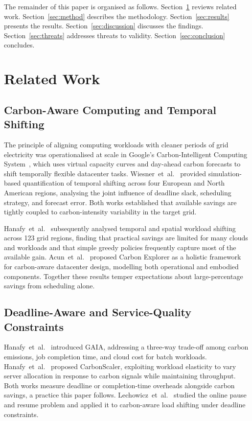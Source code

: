 \documentclass[conference]{IEEEtran}
\begin{document}
The remainder of this paper is organised as follows. Section~\ref{sec:related}
reviews related work. Section~\ref{sec:method} describes the methodology.
Section~\ref{sec:results} presents the results. Section~\ref{sec:discussion}
discusses the findings. Section~\ref{sec:threats} addresses threats to validity.
Section~\ref{sec:conclusion} concludes.

\section{Related Work}
\label{sec:related}

\subsection{Carbon-Aware Computing and Temporal Shifting}

The principle of aligning computing workloads with cleaner periods of grid
electricity was operationalised at scale in Google's Carbon-Intelligent
Computing System~\cite{radovanovic2023}, which uses virtual capacity curves and
day-ahead carbon forecasts to shift temporally flexible datacenter tasks.
Wiesner~et~al.~\cite{wiesner2021} provided simulation-based quantification of
temporal shifting across four European and North American regions, analysing
the joint influence of deadline slack, scheduling strategy, and forecast error.
Both works established that available savings are tightly coupled to
carbon-intensity variability in the target grid.

Hanafy~et~al.~\cite{frachtenberg2023limitations} subsequently analysed
temporal and spatial workload shifting across 123 grid regions, finding that
practical savings are limited for many clouds and workloads and that simple
greedy policies frequently capture most of the available gain. Acun~et~al.\
\cite{acun2023} proposed Carbon Explorer as a holistic framework for
carbon-aware datacenter design, modelling both operational and embodied
components. Together these results temper expectations about large-percentage
savings from scheduling alone.

\subsection{Deadline-Aware and Service-Quality Constraints}

Hanafy~et~al.~\cite{hanafy2024gaia} introduced GAIA, addressing a three-way
trade-off among carbon emissions, job completion time, and cloud cost for batch
workloads. Hanafy~et~al.~\cite{hanafy2024carbonscaler} proposed CarbonScaler,
exploiting workload elasticity to vary server allocation in response to carbon
signals while maintaining throughput. Both works measure deadline or
completion-time overheads alongside carbon savings, a practice this paper
follows. Lechowicz~et~al.~\cite{lechowicz2023pause} studied the online pause
and resume problem and applied it to carbon-aware load shifting under
deadline constraints.
\end{document}
